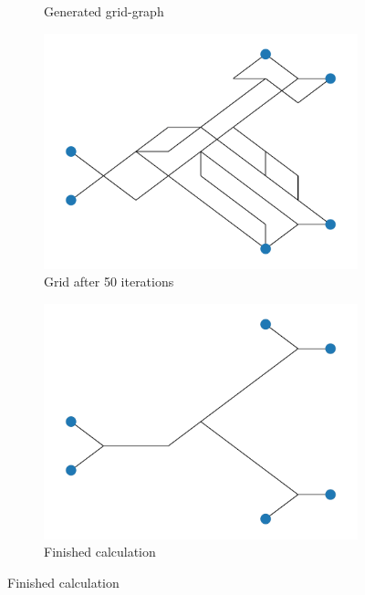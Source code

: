 \begin{figure}[H]
\begin{subfigure}{0.32\linewidth}
        \caption{Generated grid-graph}
        \label{fig:def_1}
    \end{subfigure}
    \begin{subfigure}{0.32\linewidth}
        \centering
        \includegraphics[width=\linewidth]{figures/algo_progress/default_graph_1-50.pdf}
        \caption{Grid after 50 iterations}
        \label{fig:def_2}
    \end{subfigure}
    \begin{subfigure}{0.32\linewidth}
        \centering
        \includegraphics[width=\linewidth]{figures/algo_progress/without_clean_default.pdf}
        \caption{Finished calculation}
        \label{fig:def_3}
    \end{subfigure}

\end{figure}
